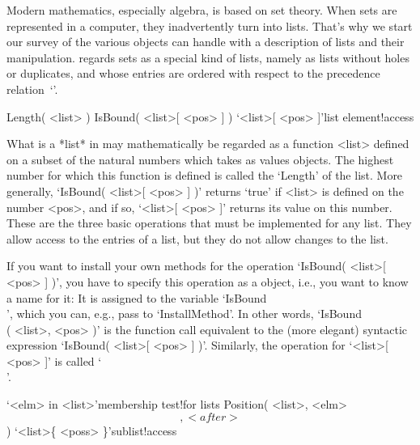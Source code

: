 
Modern mathematics, especially algebra, is based on set theory. When sets
are represented in a computer, they inadvertently turn into lists. That's
why we start our  survey of the various  objects {\GAP} can handle with a
description of  lists  and their  manipulation. {\GAP}  regards sets as a
special kind of lists, namely  as lists without  holes or duplicates, and
whose entries are ordered with respect to the precedence relation~`\<'.

\null


\>Length( <list> )
\>IsBound( <list>[ <pos> ] )
\>`<list>[ <pos> ]'{list element!access}

What is a *list* in  {\GAP} may mathematically be  regarded as a function
<list> defined on  a subset of the  natural numbers which takes as values
{\GAP} objects. The highest number for which this  function is defined is
called the `Length' of the list. More  generally, `IsBound( <list>[ <pos>
] )' returns `true' if <list> is defined on the number  <pos>, and if so,
`<list>[ <pos> ]'  returns its value on this  number. These are the three
basic operations that must be implemented for any list. They allow access
to the entries of a list, but they do not allow changes to the list.

If you  want to  install your  own  methods for  the operation  `IsBound(
<list>[  <pos>  ] )', you   have to specify this   operation  as a {\GAP}
object, i.e., you  want to know  a  name for  it: It  is  assigned to the
variable `IsBound\\[\\]', which you can,  e.g., pass to  `InstallMethod'.
In other words,  `IsBound\\[\\]( <list>,  <pos>  )' is the function  call
equivalent  to the (more  elegant) syntactic expression `IsBound( <list>[
<pos> ]  )'.  Similarly, the operation   for `<list>[ <pos> ]'  is called
`\\[\\]'.

\>`<elm> in <list>'{membership test}!{for lists}
\>Position( <list>, <elm> \[, <after> \] )
\>`<list>\{ <poss> \}'{sublist!access}

